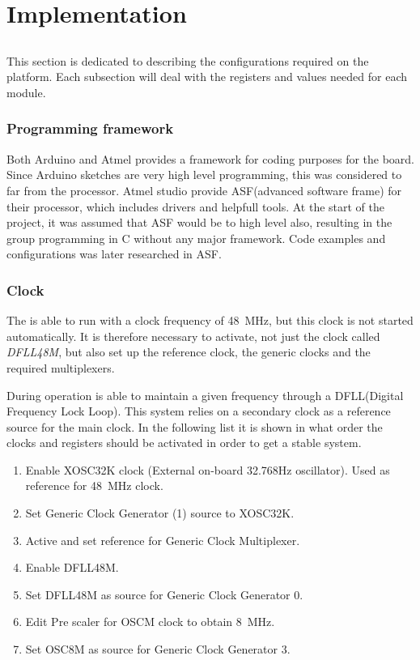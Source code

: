 
\chapter{Implementation}
\section{\SAMD}
This section is dedicated to describing the configurations required on the \SAMD platform. Each subsection will deal with the registers and values needed for each module.

\subsection{Programming framework}
Both Arduino and Atmel provides a framework for coding purposes for the \MKR board.
Since Arduino sketches are very high level programming, this was considered to far from the processor.
Atmel studio provide ASF(advanced software frame) for their processor, which includes drivers and helpfull tools.
At the start of the project, it was assumed that ASF would be to high level also, resulting in the group programming in C without any major framework.
Code examples and configurations was later researched in ASF.

\subsection{Clock}
The \SAMD is able to run with a clock frequency of \SI{48}{\mega\hertz}, but this clock is not started automatically. It is therefore necessary to activate, not just the clock called \textit{DFLL48M}, but also set up the reference clock, the generic clocks and the required multiplexers.

During operation \SAMD is able to maintain a given frequency through a DFLL(Digital Frequency Lock Loop).
This system relies on a secondary clock as a reference source for the main clock.
In the following list it is shown in what order the clocks and registers should be activated in order to get a stable system.

\begin{enumerate}
	\item Enable XOSC32K clock (External on-board 32.768Hz oscillator). Used as reference for \SI{48}{\mega\hertz} clock.
	\item Set Generic Clock Generator (1) source to XOSC32K.
	\item Active and set reference for Generic Clock Multiplexer.
	\item Enable DFLL48M.
	\item Set DFLL48M as source for Generic Clock Generator 0.
	\item Edit Pre scaler for OSCM clock to obtain \SI{8}{\mega\hertz}.
	\item Set OSC8M as source for Generic Clock Generator 3.
\end{enumerate} 

